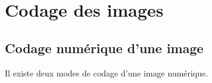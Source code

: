 \def\xxactivite{Cours}

\def\xxauteur{V. Reydellet -- UPSTI}
\fichefalse \proftrue \tdfalse \courstrue

\def\xxnumchapitre{Chapitre 3 \vspace{.2cm}}
\def\xxchapitre{\hspace{.12cm} Matrices de pixels et images}

\def\xxcompetences{%
\textsl{%
\textbf{Savoirs et compétences :}\\
\begin{itemize}[label=\ding{112},font=\color{bleuxp}] 
\item Matrices de pixels et images.
\end{itemize}
}}

\def\xxfigures{
}%


\setlength{\columnseprule}{.1pt}

\vspace{2cm}
\pagestyle{fancy}
\thispagestyle{plain}



\section{Codage des images}

\subsection{Codage numérique d'une image}


Il existe deux modes de codage d'une image numérique.\\


